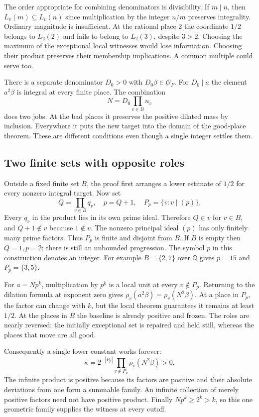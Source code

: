 \documentclass[12pt,letterpaper]{article}
\begin{document}
The order appropriate for combining denominators is divisibility. If \(m\mid n\), then \(L_v(m)\subseteq L_v(n)\) since multiplication by the integer \(n/m\) preserves integrality. Ordinary magnitude is insufficient. At the rational place 2 the coordinate \(1/2\) belongs to \(L_2(2)\) and fails to belong to \(L_2(3)\), despite \(3>2\). Choosing the maximum of the exceptional local witnesses would lose information. Choosing their product preserves their membership implications. A common multiple could serve too.

There is a separate denominator \(D_0>0\) with \(D_0\beta\in\mathcal O_F\). For \(D_0\mid a\) the element \(a^2\beta\) is integral at every finite place. The combination
\[
             N=D_0\prod_{v\in B}n_v
\]
does two jobs. At the bad places it preserves the positive dilated mass by inclusion. Everywhere it puts the new target into the domain of the good-place theorem. These are different conditions even though a single integer settles them.

\clearpage\subsection{Two finite sets with opposite roles}
Outside a fixed finite set \(B\), the proof first arranges a lower estimate of \(1/2\) for every nonzero integral target. Now set
\[
       Q=\prod_{v\in B}q_v,\quad p=Q+1,\quad
       P_p=\{v:v\mid(p)\}.
\]
Every \(q_v\) in the product lies in its own prime ideal. Therefore \(Q\in v\) for \(v\in B\), and \(Q+1\notin v\) because \(1\notin v\). The nonzero principal ideal \((p)\) has only finitely many prime factors. Thus \(P_p\) is finite and disjoint from \(B\). If \(B\) is empty then \(Q=1,p=2\); there is still an unbounded progression. The symbol \(p\) in this construction denotes an integer. For example \(B=\{2,7\}\) over \(\mathbb Q\) gives \(p=15\) and \(P_p=\{3,5\}\).

For \(a=Np^k\), multiplication by \(p^k\) is a local unit at every \(v\notin P_p\). Returning to the dilation formula at exponent zero gives
\(\rho_v(a^2\beta)=\rho_v(N^2\beta)\). At a place in \(P_p\), the factor can change with \(k\), but the local theorem guarantees it remains at least \(1/2\). At the places in \(B\) the baseline is already positive and frozen. The roles are nearly reversed: the initially exceptional set is repaired and held still, whereas the places that move are all good.

Consequently a single lower constant works forever:
\[
 \kappa=2^{-|P_p|}\prod_{v\notin P_p}\rho_v(N^2\beta)>0.
\]
The infinite product is positive because its factors are positive and their absolute deviations from one form a summable family. An infinite collection of merely positive factors need not have positive product. Finally \(Np^k\ge2^k>k\), so this one geometric family supplies the witness at every cutoff.
\end{document}

